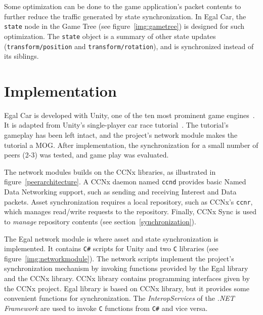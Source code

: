 \documentclass{article}
\begin{document}
Some optimization can be done to the game application's packet contents to further reduce the traffic generated by state synchronization. In Egal Car, the \texttt{state} node in the Game Tree (see figure~\ref{img:gametree}) is designed for such optimization. The \texttt{state} object is a summary of other state updates (\texttt{transform/position} and \texttt{transform/rotation}), and is synchronized instead of its siblings.


\section{Implementation}
\label{implementation}

Egal Car is developed with Unity, one of the ten most prominent game engines~\cite{unityrank}. It is adapted from Unity's single-player car race tutorial~\cite{UnityCar}. The tutorial's gameplay has been left intact, and the project's network module makes the tutorial a MOG.  After implementation, the synchronization for a small number of peers (2-3) was tested, and game play was evaluated. 

The network modules builds on the CCNx libraries, as illustrated in figure~\ref{peerarchitecture}. A CCNx daemon named \texttt{ccnd} provides basic Named Data Networking support, such as sending and receiving Interest and Data packets.  Asset synchronization requires a local repository, such as CCNx's \texttt{ccnr}, which manages read\slash write requests to the repository. Finally, CCNx Sync is used to \emph{manage} repository contents (see section~\ref{synchronization}). 

The Egal network module is where asset and state synchronization is implemented. It contains \texttt{C\#} scripts for Unity and two \texttt{C} libraries (see figure~\ref{img:networkmodule}). The network scripts implement the project's synchronization mechanism by invoking functions provided by the Egal library and the CCNx library. CCNx library contains programming interfaces given by the CCNx project. Egal library is based on CCNx library, but it provides some convenient functions for synchronization. The \emph{InteropServices} of the \emph{.NET Framework} are used to invoke \texttt{C} functions from \texttt{C\#} and vice versa.


\def\tboxl[#1,#2,#3,#4,#5]#6{%
  \node[draw,, minimum height=#1, minimum width=#2, %
  inner color=white, outer color=white, color=black] (#4) at #5 {}; %
  \node[anchor=#3,inner sep=2pt] at (#4.#3) {#6};%
}
\end{document}
